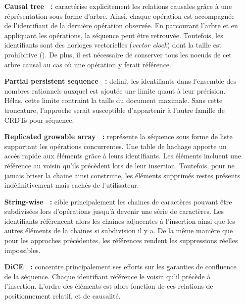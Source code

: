 \begin{itemize}
\item [\textbf{Causal tree~\cite{grishchenko2010deep} :}] caractérise
  explicitement les relations causales grâce à une réprésentation sous forme
  d'arbre. Ainsi, chaque opération est accompagnée de l'identifiant de la
  dernière opération observée. En parcourant l'arbre et en appliquant les
  opérations, la séquence peut être retrouvée. Toutefois, les identifiants sont
  des horloges vectorielles (\emph{vector clock}) dont la taille est prohibitive
  (\REF). De plus, il est nécessaire de conserver tous les noeuds de cet arbre
  causal au cas où une opération y ferait référence.
\item [\textbf{Partial persistent sequence~\cite{wu2010partial} :}] definit les
  identifiants dans l'ensemble des nombres rationnels auxquel est ajoutée une
  limite quant à leur précision. Hélas, cette limite contraint la taille du
  document maximale. Sans cette troncature, l'approche serait susceptible
  d'appartenir à l'autre famille de CRDTs pour séquence.
\item [\textbf{Replicated growable array~\cite{roh2011replicated} :}] représente
  la séquence sous forme de liste supportant les opérations concurrentes. Une
  table de hachage apporte un accès rapide aux éléments grâce à leurs
  identifiants. Les éléments incluent une référence au voisin qu'ils précèdent
  lors de leur insertion. Toutefois, pour ne jamais briser la chaine ainsi
  construite, les éléments supprimés restes présents indéfinitivement mais
  cachés de l'utilisateur.
\item [\textbf{String-wise~\cite{yu2012stringwise} :}] cible principalement les
  chaines de caractères pouvant être subdivisées lors d'opérations jusqu'à
  devenir une série de caractères. Les identifiants référencent alors les
  chaines adjacentes à l'insertion ainsi que les autres éléments de la chaines
  si subdivision il y a. De la même manière que pour les approches précédentes,
  les références rendent les suppressions réelles impossibles.
\item [\textbf{DiCE~\cite{conway2014language} :}] concentre principalement ses
  efforts sur les garanties de confluence de la séquence. Chaque identifiant
  référence le voisin qu'il précède à l'insertion. L'ordre des éléments est
  alors fonction de ces relations de positionnement relatif, et de causalité.
\end{itemize}

